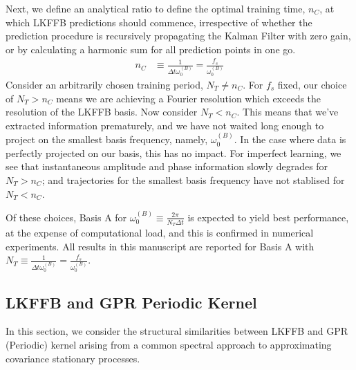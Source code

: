  Next, we define an analytical ratio to define the optimal training time, $n_C$, at which LKFFB predictions should commence, irrespective of whether the prediction procedure is recursively propagating the Kalman Filter with zero gain, or by calculating a harmonic sum for all prediction points in one go. 
 \begin{align}
 n_C &\equiv \frac{1}{\Delta t \omega_0^{(B)}} = \frac{f_s}{\omega_0^{(B)}} \label{eqn:sec:ap_liska_fixedbasis_nC}
 \end{align}
 Consider an arbitrarily chosen training period, $N_T \neq n_C $.  For $f_s$ fixed, our choice of $N_T > n_C $ means we are achieving a Fourier resolution which exceeds the resolution of the LKFFB basis. Now consider $N_T< n_C$. This means that we've extracted information prematurely, and we have not waited long enough to project on the smallest basis frequency, namely, $\omega_0^{(B)}$.  In the case where data is perfectly projected on our basis, this has no impact. For imperfect learning, we see that instantaneous amplitude and phase information slowly degrades for $N_T > n_C$; and trajectories for the smallest basis frequency have not stablised for $N_T < n_C$. 
 
 Of these choices, Basis A for $\omega_0^{(B)} \equiv \frac{2\pi}{N_T \Delta t}$ is expected to yield best performance, at the expense of computational load, and this is confirmed in numerical experiments. All results in this manuscript are reported for Basis A with $N_T \equiv \frac{1}{\Delta t \omega_0^{(B)}} = \frac{f_s}{\omega_0^{(B)}} $.

\subsection{LKFFB and GPR Periodic Kernel}

In this section, we consider the structural similarities between LKFFB and GPR (Periodic) kernel arising from a common spectral approach to approximating covariance stationary processes. 

